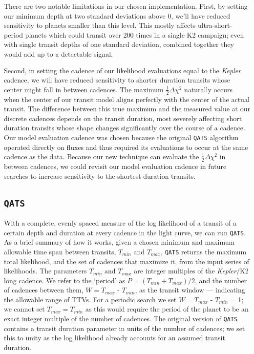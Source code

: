 \documentclass[twocolumn]{aastex62}
\newcommand{\project}[1]{\textsl{#1}}
\newcommand{\pipeline}[1]{\texttt{#1}}
\begin{document}
There are two notable limitations in our chosen implementation. First,
by setting our minimum depth at two standard deviations above 0, we'll
have reduced sensitivity to planets smaller than this level. This
mostly affects ultra-short-period planets which could transit over 200
times in a single K2 campaign; even with single transit depths of one
standard deviation, combined together they would add up to a
detectable signal.

Second, in setting the cadence of our likelihood evaluations equal to
the \project{Kepler} cadence, we will have reduced sensitivity to
shorter duration transits whose center might fall in between
cadences. The maximum $\frac{1}{2}\Delta \chi^2$ naturally occurs when
the center of our transit model aligns perfectly with the center of
the actual transit. The difference between this true maximum and the
measured value at our discrete cadences depends on the transit
duration, most severely affecting short duration transits whose shape
changes significantly over the course of a cadence. Our model
evaluation cadence was chosen because the original \pipeline{QATS}
algorithm operated directly on fluxes and thus required its
evaluations to occur at the same cadence as the data. Because our new
technique can evaluate the $\frac{1}{2}\Delta \chi^2$ in between
cadences, we could revisit our model evaluation cadence in future
searches to increase sensitivity to the shortest duration transits.


\subsection{\pipeline{QATS}}
\label{qats}

With a complete, evenly spaced measure of the log likelihood of a
transit of a certain depth and duration at every cadence in the light
curve, we can run \pipeline{QATS}. As a brief summary of how it works,
given a chosen minimum and maximum allowable time span between
transits, $T_{min}$ and $T_{max}$, \pipeline{QATS} returns the maximum
total likelihood, and the set of cadences that maximize it, from the
input series of likelihoods. The parameters $T_{min}$ and $T_{max}$
are integer multiples of the \project{Kepler}/K2 long cadence.  We
refer to the `period' as $P=(T_{min}+T_{max})/2$, and the number of
cadences between them, $W = T_{max}$ - $T_{min}$, as the transit
window --- indicating the allowable range of TTVs. For a periodic
search we set $W = T_{max}$ - $T_{min}$ = 1; we cannot set $T_{max} =
T_{min}$ as this would require the period of the planet to be an exact
integer multiple of the number of cadences. The original version of
\pipeline{QATS} contains a transit duration parameter in units of the
number of cadences; we set this to unity as the log likelihood already
accounts for an assumed transit duration.
\end{document}
